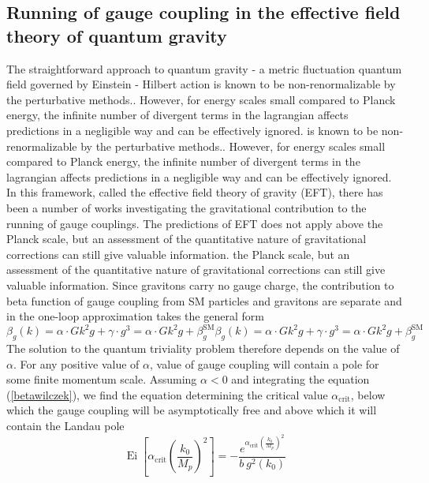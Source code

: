 \documentclass[11pt, a4paper]{article}
\begin{document}
\subsection{Running of gauge coupling in the effective field theory of quantum gravity}
The straightforward approach to quantum gravity - a metric fluctuation quantum field governed by Einstein - Hilbert action
is known to be non-renormalizable by the perturbative methods.\cite{book}. However, for energy scales small
compared to Planck energy, the infinite number of divergent terms in the lagrangian affects predictions in a negligible way and can be effectively ignored.
is known to be non-renormalizable by the perturbative methods.\cite{book}. However, for energy scales small
compared to Planck energy, the infinite number of divergent terms in the lagrangian affects predictions in a negligible way and can be effectively ignored.
In this framework, called the effective field theory of gravity (EFT), there has been a number of works investigating
the gravitational contribution to the running of gauge couplings. The predictions of EFT does not apply above
the Planck scale, but an assessment of the quantitative nature of gravitational corrections can still give valuable information.
the Planck scale, but an assessment of the quantitative nature of gravitational corrections can still give valuable information.
Since gravitons carry no gauge charge, the contribution to beta function of gauge coupling from SM particles and gravitons are separate
and in the one-loop approximation takes the general form
\begin{equation}
    \beta_g(k) = \alpha \cdot G k^2 g + \gamma \cdot g^3 = \alpha \cdot G k^2 g + \beta_{g}^{\text{SM}}
    \beta_g(k) = \alpha \cdot G k^2 g + \gamma \cdot g^3 = \alpha \cdot G k^2 g + \beta_{g}^{\text{SM}}
    \label{betawilczek}
\end{equation}
The solution to the quantum triviality problem therefore depends on the value of $\alpha$.
For any positive value of $\alpha$, value of gauge coupling will contain a pole for some finite momentum scale.
Assuming $\alpha < 0$ and integrating the equation (\ref{betawilczek}), we find the equation determining the critical value $\alpha_{\text{crit}}$, below which the gauge coupling will be asymptotically free and above which it will contain the Landau pole
\begin{equation}
\operatorname{Ei}\left[\alpha_{\text{crit}} \left( \frac{k_0}{M_p} \right)^2 \right]
    = - \frac{e^{\alpha_{\text{crit}} \left( \frac{k_0}{M_p} \right)^2}}{b \ g^2(k_0)}%
\end{equation}
\end{document}
